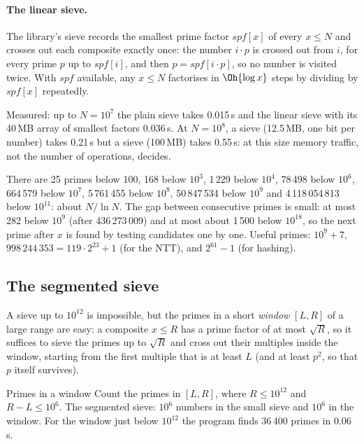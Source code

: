\paragraph{The linear sieve.} The library's sieve records the smallest prime factor $\mathit{spf}[x]$ of every $x \le N$ and crosses out
each composite exactly once: the number $i \cdot p$ is crossed out from $i$, for every prime $p$ up to $\mathit{spf}[i]$, and then
$p = \mathit{spf}[i \cdot p]$, so no number is visited twice. With $\mathit{spf}$ available, any $x \le N$ factorises in $\Oh{\log x}$
steps by dividing by $\mathit{spf}[x]$ repeatedly.


Measured: up to $N = 10^7$ the plain sieve takes 0.015\,s and the linear sieve with its 40\,MB array of smallest factors 0.036\,s. At
$N = 10^8$, a  sieve (12.5\,MB, one bit per number) takes 0.21\,s but a  sieve (100\,MB) takes 0.55\,s:
at this size memory traffic, not the number of operations, decides.

\begin{fact}
There are 25 primes below 100, 168 below $10^3$, 1\,229 below $10^4$, 78\,498 below $10^6$, 664\,579 below $10^7$, 5\,761\,455 below
$10^8$, 50\,847\,534 below $10^9$ and 4\,118\,054\,813 below $10^{11}$: about $N / \ln N$. The gap between consecutive primes is small:
at most 282 below $10^9$ (after 436\,273\,009) and at most about 1\,500 below $10^{18}$, so the next prime after $x$ is found by testing
candidates one by one. Useful primes: $10^9 + 7$, $998\,244\,353 = 119 \cdot 2^{23} + 1$ (for the NTT), and $2^{61} - 1$ (for hashing).
\end{fact}

\subsection{The segmented sieve}

A sieve up to $10^{12}$ is impossible, but the primes in a short \emph{window} $[L, R]$ of a large range are easy: a composite $x \le R$
has a prime factor of at most $\sqrt R$, so it suffices to sieve the primes up to $\sqrt R$ and cross out their multiples inside the
window, starting from the first multiple that is at least $L$ (and at least $p^2$, so that $p$ itself survives).

\begin{problem}{Primes in a window}
Count the primes in $[L, R]$, where $R \le 10^{12}$ and $R - L \le 10^6$.
\solution The segmented sieve: $10^6$ numbers in the small sieve and $10^6$ in the window. For the window just below $10^{12}$ the
program finds 36\,400 primes in 0.06\,s.
\end{problem}

